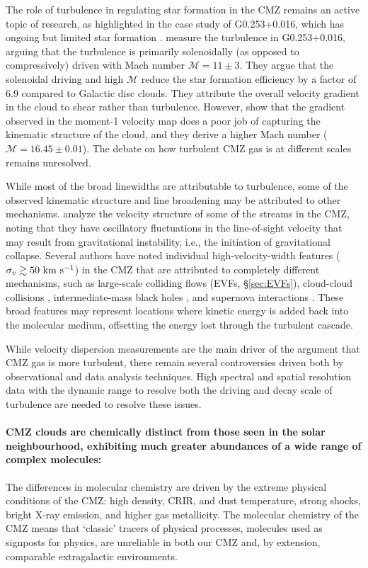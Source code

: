The role of turbulence in regulating star formation in the CMZ remains an active topic of research, as highlighted in the case study of G0.253+0.016, which has ongoing but limited star formation \citep{Walker2021}.
\citet{Federrath2016} measure the turbulence in G0.253+0.016, arguing that the turbulence is primarily solenoidally (as opposed to compressively) driven with Mach number $\mathcal{M}=11\pm3$.  
They argue that the solenoidal driving and high $\mathcal{M}$ reduce the star formation efficiency by a factor of 6.9 compared to Galactic disc clouds.
They attribute the overall velocity gradient in the cloud to shear rather than turbulence.
However, \citet{Henshaw2019} show that the gradient observed in the moment-1 velocity map does a poor job of capturing the kinematic structure of the cloud, and they derive a higher Mach number ($\mathcal{M}=16.45\pm0.01$).  
The debate on how turbulent CMZ gas is at different scales remains unresolved.

While most of the broad linewidths are attributable to turbulence,
some of the observed kinematic structure and line broadening may be attributed to other mechanisms.
\citet{Henshaw2016a, Henshaw2020} analyze the velocity structure of some of the streams in the CMZ, noting that they have oscillatory fluctuations in the line-of-sight velocity that may result from gravitational instability, i.e., the initiation of gravitational collapse.
Several authors have noted individual high-velocity-width features ($\sigma_v \gtrsim 50~\mbox{${\rm km}~{\rm s}^{-1}$}$) in the CMZ that are attributed to completely different mechanisms, such as large-scale colliding flows (EVFs, \S\ref{sec:EVFs}), cloud-cloud collisions \citep{Tanaka2015,Tsuboi2021}, intermediate-mass black holes \citep{Oka2016}, and supernova interactions \citep{Tanaka2014,Yalinewich2018}.
These broad features may represent locations where kinetic energy is added back into the molecular medium, offsetting the energy lost through the turbulent cascade.

While velocity dispersion measurements are the main driver of the argument that CMZ gas is more turbulent, there remain several controversies driven both by observational and data analysis techniques.
High spectral and spatial resolution data with the dynamic range to resolve both the driving and decay scale of turbulence are needed to resolve these issues.

\paragraph{CMZ clouds are chemically distinct from those seen in the solar neighbourhood, exhibiting much greater abundances of a wide range of complex molecules:}\label{sec:cloudchemistry} The differences in molecular chemistry are driven by the extreme
physical conditions of the CMZ: high density, CRIR, and dust temperature, strong shocks, bright X-ray emission, and higher gas metallicity.
The molecular chemistry of the CMZ means that `classic' tracers of physical processes, molecules used as signposts for physics, are unreliable in both our CMZ and, by extension, comparable extragalactic environments.

